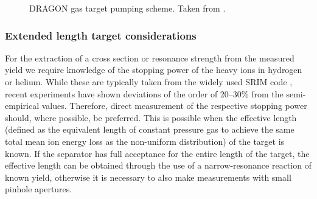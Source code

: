 \begin{figure}
\caption{DRAGON gas target pumping scheme. Taken from \cite{hutc03b}.}
\label{fig:dragon_pumping}
\end{figure}

\subsubsection{Extended length target considerations}
For the extraction of a cross section or resonance strength from the measured yield we require knowledge of the stopping power of the heavy ions in hydrogen or helium. While these are typically taken from the widely used SRIM code \cite{zieg}, recent experiments \cite{grei04} have shown deviations of the order of 20--30\% from the semi-empirical values. Therefore, direct measurement of the respective stopping power should, where possible, be preferred. This is possible when the effective length (defined as the equivalent length of constant pressure gas to achieve the same total mean ion energy loss as the non-uniform distribution) of the target is known. If the separator has full acceptance for the entire length of the target, the effective length can be obtained through the use of a narrow-resonance reaction of known yield, otherwise it is necessary to also make measurements with small pinhole apertures. 

